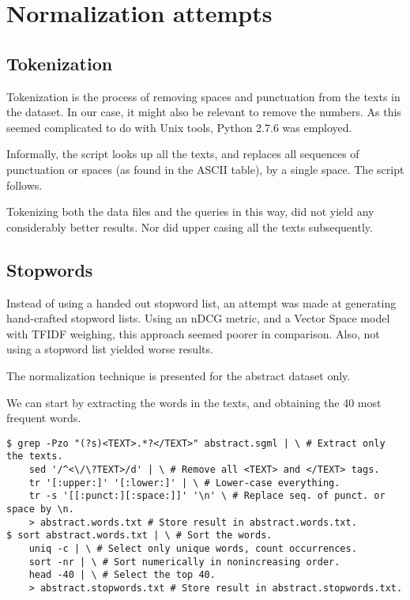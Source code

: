 
\section{Normalization attempts}

\subsection{Tokenization}

Tokenization is the process of removing spaces and punctuation from the texts
in the dataset. In our case, it might also be relevant to remove the numbers.
As this seemed complicated to do with Unix tools, Python 2.7.6 was employed.

Informally, the script looks up all the texts, and replaces all sequences of
punctuation or spaces (as found in the ASCII table), by a single space. The
script follows.



Tokenizing both the data files and the queries in this way, did not yield any
considerably better results. Nor did upper casing all the texts subsequently.

\subsection{Stopwords}

Instead of using a handed out stopword list, an attempt was made at generating
hand-crafted stopword lists. Using an nDCG metric, and a Vector Space model
with TFIDF weighing, this approach seemed poorer in comparison. Also, not using
a stopword list yielded worse results.

The normalization technique is presented for the abstract dataset only.

We can start by extracting the words in the texts, and obtaining the 40 most
frequent words.


\begin{lstlisting}
$ grep -Pzo "(?s)<TEXT>.*?</TEXT>" abstract.sgml | \ # Extract only the texts.
    sed '/^<\/\?TEXT>/d' | \ # Remove all <TEXT> and </TEXT> tags.
    tr '[:upper:]' '[:lower:]' | \ # Lower-case everything.
    tr -s '[[:punct:][:space:]]' '\n' \ # Replace seq. of punct. or space by \n.
    > abstract.words.txt # Store result in abstract.words.txt.
$ sort abstract.words.txt | \ # Sort the words.
    uniq -c | \ # Select only unique words, count occurrences.
    sort -nr | \ # Sort numerically in nonincreasing order.
    head -40 | \ # Select the top 40.
    > abstract.stopwords.txt # Store result in abstract.stopwords.txt.
\end{lstlisting}

